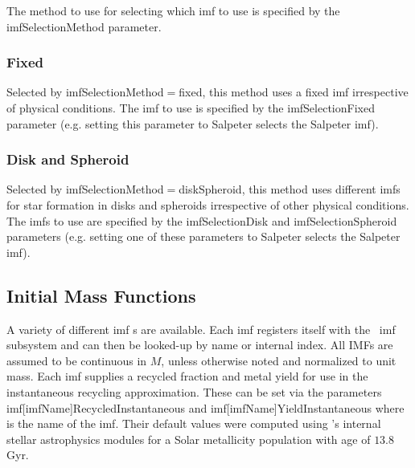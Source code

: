 The method to use for selecting which \gls{imf} to use is specified by the {\normalfont \ttfamily imfSelectionMethod} parameter.

\subsubsection{Fixed}

Selected by {\normalfont \ttfamily imfSelectionMethod}$=${\normalfont \ttfamily fixed}, this method uses a fixed \gls{imf} irrespective of physical conditions. The \gls{imf} to use is specified by the {\normalfont \ttfamily imfSelectionFixed} parameter (e.g. setting this parameter to {\normalfont \ttfamily Salpeter} selects the Salpeter \gls{imf}).

\subsubsection{Disk and Spheroid}

Selected by {\normalfont \ttfamily imfSelectionMethod}$=${\normalfont \ttfamily diskSpheroid}, this method uses different {\gls{imf}}s for star formation in disks and spheroids irrespective of other physical conditions. The {\gls{imf}}s to use are specified by the {\normalfont \ttfamily imfSelectionDisk} and {\normalfont \ttfamily imfSelectionSpheroid} parameters (e.g. setting one of these parameters to {\normalfont \ttfamily Salpeter} selects the Salpeter \gls{imf}).

\subsection{Initial Mass Functions}\label{sec:physicsIMF}

A variety of different \gls{imf} s are available. Each \gls{imf} registers itself with the \glc\ \gls{imf} subsystem and can then be looked-up by name or internal index. All IMFs are assumed to be continuous in $M$, unless otherwise noted and normalized to unit mass. Each \gls{imf} supplies a recycled fraction and metal yield for use in the instantaneous recycling approximation. These can be set via the parameters {\normalfont \ttfamily imf[imfName]RecycledInstantaneous} and {\normalfont \ttfamily imf[imfName]YieldInstantaneous} where {\normalfont \ttfamily [imfName]} is the name of the \gls{imf}. Their default values were computed using \glc 's internal stellar astrophysics modules for a Solar metallicity population with age of $13.8$ Gyr.

